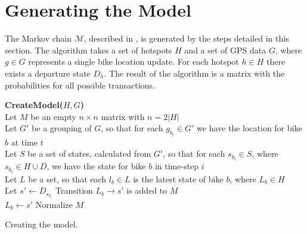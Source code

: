 \section{Generating the Model}\label{sec:generatemarkov}
The Markov chain $\mathcal{M}$, described in , is generated by the steps detailed in this section.
The algorithm takes a set of hotspots $H$ and a set of GPS data $G$, where $g \in G$ represents a single bike location update. For each hotspot $h \in H$ there exists a departure state $D_h$.
The result of the algorithm is a matrix with the probabilities for all possible transactions.

\begin{algorithm}[H]
\SetAlgoNoEnd
\textbf{CreateModel($H, G$)} \\
Let $M$ be an empty $n \times n$ matrix with $n = 2|H|$ \\
Let $G'$ be a grouping of $G$, so that for each $g_{b_t} \in G'$ we have the location for bike $b$ at time $t$\\
Let $S$ be a set of states, calculated from $G'$, so that for each $s_{b_i} \in S$, where $s_{b_i} \in H \cup D$, we have the state for bike $b$ in time-step $i$\\
Let $L$ be a set, so that each $l_b \in L$ is the latest state of bike $b$, where $L_b \in H$\\
    {
      {Let $s' \leftarrow D_{s_{b_i}}$}
    Transition $L_b \rightarrow s'$ is added to $M$\\
     $L_b \leftarrow s'$}
Normalize $M$\\
\caption{Creating the model.}
\label{markov:create_model}
\end{algorithm}